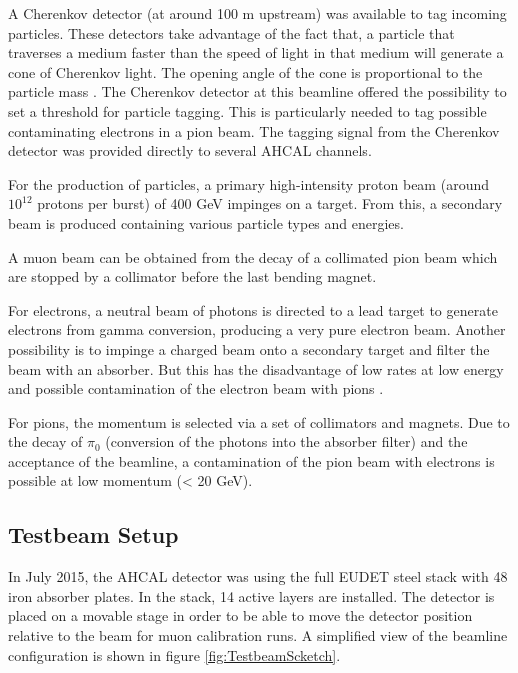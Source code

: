 A Cherenkov detector (at around 100 m upstream) was available to tag incoming particles. These detectors take advantage of the fact that, a particle that traverses a medium faster than the speed of light in that medium will generate a cone of Cherenkov light. The opening angle of the cone is proportional to the particle mass \cite{GOVORKOV20059}. The Cherenkov detector at this beamline offered the possibility to set a threshold for particle tagging. This is particularly needed to tag possible contaminating electrons in a pion beam. The tagging signal from the Cherenkov detector was provided directly to several AHCAL channels.

For the production of particles, a primary high-intensity proton beam (around $10^{12}$ protons per burst) of 400 GeV impinges on a target. From this, a secondary beam is produced containing various particle types and energies.

A muon beam can be obtained from the decay of a collimated pion beam which are stopped by a collimator before the last bending magnet.

For electrons, a neutral beam of photons is directed to a lead target to generate electrons from gamma conversion, producing a very pure electron beam. Another possibility is to impinge a charged beam onto a secondary target and filter the beam with an absorber. But this has the disadvantage of low rates at low energy and possible contamination of the electron beam with pions \cite{H2Beamline}.

For pions, the momentum is selected via a set of collimators and magnets. Due to the decay of $\pi_0$ (conversion of the photons into the absorber filter) and the acceptance of the beamline, a contamination of the pion beam with electrons is possible at low momentum (< 20 GeV).

\subsection{Testbeam Setup}
\label{sec:TBsetup}

In July 2015, the AHCAL detector was using the full EUDET steel stack \cite{EUDET-Report-2010-02} with 48 iron absorber plates. In the stack, 14 active layers are installed. The detector is placed on a movable stage in order to be able to move the detector position relative to the beam for muon calibration runs. A simplified view of the beamline configuration is shown in figure \ref{fig:TestbeamScketch}.

